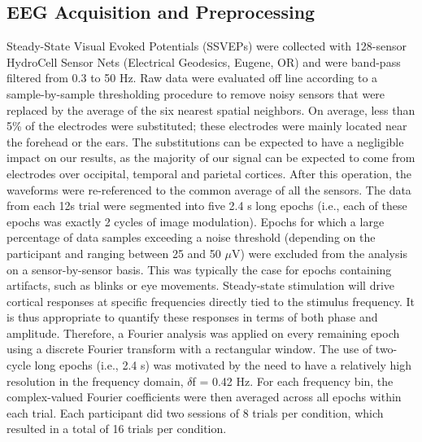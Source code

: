 \documentclass[11pt, twoside]{article}
\begin{document}
\subsection*{EEG Acquisition and Preprocessing}
Steady-State Visual Evoked Potentials (SSVEPs) were collected with 128-sensor HydroCell Sensor Nets (Electrical Geodesics, Eugene, OR) and were band-pass filtered from 0.3 to 50 Hz. Raw data were evaluated off line according to a sample-by-sample thresholding procedure to remove noisy sensors that were replaced by the average of the six nearest spatial neighbors. On average, less than 5\% of the electrodes were substituted; these electrodes were mainly located near the forehead or the ears. The substitutions can be expected to have a negligible impact on our results, as the majority of our signal can be expected to come from electrodes over occipital, temporal and parietal cortices. After this operation, the waveforms were re-referenced to the common average of all the sensors. The data from each 12s trial were segmented into five 2.4 s long epochs (i.e., each of these epochs was exactly 2 cycles of image modulation). Epochs for which a large percentage of data samples exceeding a noise threshold (depending on the participant and ranging between 25 and 50 $\mu$V) were excluded from the analysis on a sensor-by-sensor basis. This was typically the case for epochs containing artifacts, such as blinks or eye movements. Steady-state stimulation will drive cortical responses at specific frequencies directly tied to the stimulus frequency. It is thus appropriate to quantify these responses in terms of both phase and amplitude. Therefore, a Fourier analysis was applied on every remaining epoch using a discrete Fourier transform with a rectangular window. The use of two-cycle long epochs (i.e., 2.4 s) was motivated by the need to have a relatively high resolution in the frequency domain, $\delta$f = 0.42 Hz. For each frequency bin, the complex-valued Fourier coefficients were then averaged across all epochs within each trial. Each participant did two sessions of 8 trials per condition, which resulted in a total of 16 trials per condition.
\end{document}
